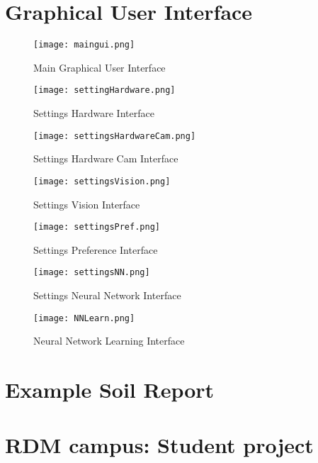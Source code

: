 \documentclass[11pt,fleqn,,a4paper,twoside,openright]{book}
\begin{document}
\cleardoublepage
{}
\setlength{\columnsep}{0.75cm}
\printindex

\appendix
{}
\chapter{Graphical User Interface}
\begin{figure}[h]
	\texttt{[image: maingui.png]}
	\caption{Main Graphical User Interface}
\end{figure}
\begin{figure}[h]
	\texttt{[image: settingHardware.png]}
	\caption{Settings Hardware Interface}
\end{figure}
\begin{figure}[h]
	\texttt{[image: settingsHardwareCam.png]}
	\caption{Settings Hardware Cam Interface}
\end{figure}
\begin{figure}[h]
	\texttt{[image: settingsVision.png]}
	\caption{Settings Vision Interface}
\end{figure}
\begin{figure}[h]
	\texttt{[image: settingsPref.png]}
	\caption{Settings Preference Interface}
\end{figure}
\begin{figure}[h]
	\texttt{[image: settingsNN.png]}
	\caption{Settings Neural Network Interface}
\end{figure}
\begin{figure}[h]
	\texttt{[image: NNLearn.png]}
	\caption{Neural Network Learning Interface}
\end{figure}

\chapter{Example Soil Report}


\chapter{RDM campus: Student project}\label{RDM_Campus}

\end{document}

